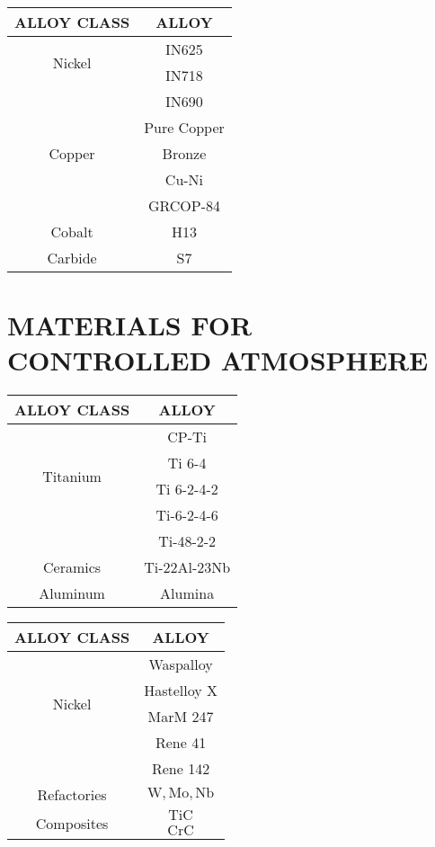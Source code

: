 \documentclass[10pt]{article}
\begin{document}
\begin{center}
\begin{tabular}{|c|c|}
\hline
ALLOY CLASS & ALLOY \\
\hline
\multirow{2}{*}{Nickel} & IN625 \\
 & IN718 \\
\hline
 & IN690 \\
\hline
\multirow{3}{*}{Copper} & Pure Copper \\
\cline { 2 - 2 }
 & Bronze \\
\hline
\multirow{3}{*}{} & Cu-Ni \\
 & GRCOP-84 \\
\hline
Cobalt & H13 \\
\hline
Carbide & S7 \\
\hline
\end{tabular}
\end{center}

\section*{MATERIALS FOR CONTROLLED ATMOSPHERE}
\begin{center}
\begin{tabular}{|c|c|}
\hline
ALLOY CLASS & \multicolumn{1}{|c|}{ALLOY} \\
\hline
\multirow{4}{*}{Titanium} & CP-Ti \\
\cline { 2 - 2 }
 & Ti 6-4 \\
\cline { 2 - 2 }
 & Ti 6-2-4-2 \\
\cline { 2 - 2 }
 & Ti-6-2-4-6 \\
\cline { 2 - 2 }
 & Ti-48-2-2 \\
\hline
Ceramics & Ti-22Al-23Nb \\
\hline
Aluminum & Alumina \\
\hline
\end{tabular}
\end{center}

\begin{center}
\begin{tabular}{|c|c|}
\hline
ALLOY CLASS & ALLOY \\
\hline
\multirow{4}{*}{Nickel} & Waspalloy \\
\cline { 2 - 2 }
 & Hastelloy $\mathrm{X}$ \\
\cline { 2 - 2 }
 & MarM 247 \\
\cline { 2 - 2 }
 & Rene 41 \\
\cline { 2 - 2 }
 & Rene 142 \\
\hline
Refactories & $\mathrm{W}, \mathrm{Mo}, \mathrm{Nb}$ \\
\hline
\multirow{2}{*}{Composites} & $\mathrm{TiC}$ \\
\hline
 & $\mathrm{CrC}$ \\
\hline
\end{tabular}
\end{center}
\end{document}
